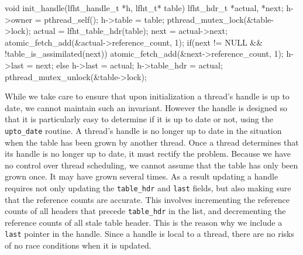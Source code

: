 \begin{center}
\begin{clisting}
void init_handle(lfht_handle_t *h, lfht_t* table){
  lfht_hdr_t *actual, *next;
  h->owner = pthread_self();
  h->table = table;
  pthread_mutex_lock(&table->lock);
  actual = lfht_table_hdr(table);
  next = actual->next;
  atomic_fetch_add(&actual->reference_count, 1);
  if(next != NULL && !table_is_assimilated(next)){
    atomic_fetch_add(&next->reference_count, 1);
    h->last = next;
  } else {
    h->last = actual;
  }
  h->table_hdr = actual;
  pthread_mutex_unlock(&table->lock);
}
\end{clisting}
\end{center}

While we take care to ensure that upon initialization a thread's
handle is up to date, we cannot maintain such an invariant. However
the handle is designed so that it is particularly easy to determine if
it is up to date or not, using the \texttt{upto\_date} routine.  A
thread's handle is no longer up to date in the situation when the
table has been grown by another thread.  Once a thread determines that
its handle is no longer up to date, it must rectify the problem. 
Because we have no control over thread scheduling, we cannot 
assume that the table has only been grown once. It may have grown several times.
As a result updating a handle requires not only updating the
\texttt{table\_hdr} and \texttt{last} fields, but also making sure
that the reference counts are accurate. This involves incrementing the
reference counts of all headers that precede \texttt{table\_hdr} in
the list, and decrementing the reference counts of all stale table
header.  This is the reason why we include a \texttt{last} pointer in the handle.
Since a handle is local to a thread, there are no risks of no race
conditions when it is updated.


